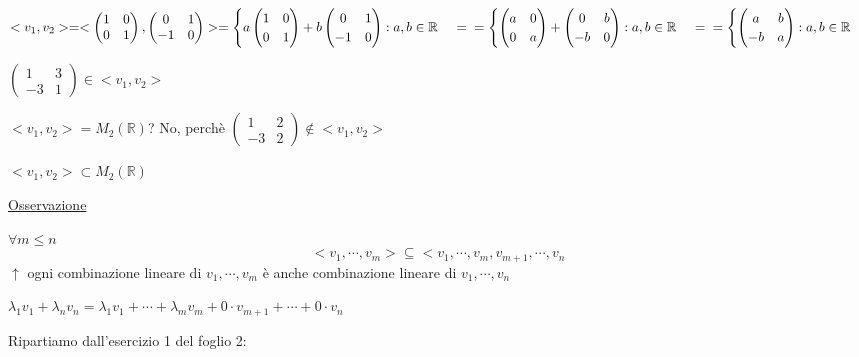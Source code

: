 \documentclass{article}
\newcommand{\ul}[1]{\underline{#1}}
\newcommand{\R}{\mathbb{R}}
\begin{document}
\begin{itemize}
	      $<v_1,v_2>=<\begin{pmatrix}1&0\\0&1\end{pmatrix},\begin{pmatrix}0&1\\-1&0\end{pmatrix}>=\begin{cases}a\begin{pmatrix}1&0\\0&1\end{pmatrix}+b\begin{pmatrix}0&1\\-1&0\end{pmatrix}:a,b\in\R\end{cases}=\\=\begin{cases}\begin{pmatrix}a&0\\0&a\end{pmatrix}+\begin{pmatrix}0&b\\-b&0\end{pmatrix}:a,b\in\R\end{cases}=\\=\begin{cases}\begin{pmatrix}a&b\\-b&a\end{pmatrix}:a,b\in\R\end{cases}$

	      $\begin{pmatrix}1&3\\-3&1\end{pmatrix}\in<v_1,v_2>$

	      $<v_1,v_2>=M_2(\R)$? No, perchè $\begin{pmatrix}1&2\\-3&2\end{pmatrix}\not\in<v_1,v_2>$

	      $<v_1,v_2>\subset M_2(\R)$

	      \ul{Osservazione}

	      $\forall m\leq n$
	      $$<v_1,\cdots,v_m>\subseteq <v_1,\cdots,v_m,v_{m+1},\cdots,v_n$$
	      $\uparrow$ ogni combinazione lineare di $v_1,\cdots,v_m$ è anche combinazione lineare di $v_1,\cdots,v_n$

	      $\lambda_1v_1+\lambda_nv_n=\lambda_1v_1+\cdots+\lambda_mv_m+0\cdot v_{m+1}+\cdots+0\cdot v_n$
\end{itemize}
Ripartiamo dall'esercizio 1 del foglio 2:
\end{document}
